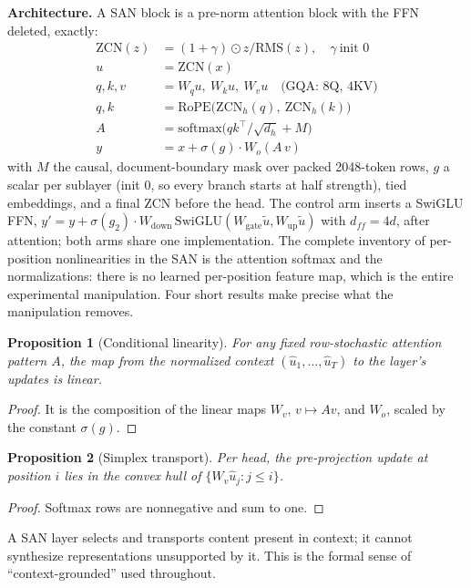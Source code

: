 \documentclass[letterpaper]{article} %
\newtheorem{proposition}{Proposition}
\begin{document}
\textbf{Architecture.} A SAN block is a pre-norm attention block with the
FFN deleted, exactly:
\begin{align*}
\mathrm{ZCN}(z) &= (1+\gamma)\odot z/\mathrm{RMS}(z), \quad \gamma\
\text{init } 0\\
u &= \mathrm{ZCN}(x)\\
q,k,v &= W_q u,\ W_k u,\ W_v u \quad \text{(GQA: 8Q, 4KV)}\\
q,k &= \mathrm{RoPE}\big(\mathrm{ZCN}_h(q),\ \mathrm{ZCN}_h(k)\big)\\
A &= \mathrm{softmax}\big(qk^{\top}/\sqrt{d_h} + M\big)\\
y &= x + \sigma(g)\cdot W_o(A\,v)
\end{align*}
with $M$ the causal, document-boundary mask over packed 2048-token rows,
$g$ a scalar per sublayer (init 0, so every branch starts at half
strength), tied embeddings, and a final ZCN before the head. The control
arm inserts a SwiGLU FFN, $y' = y + \sigma(g_2)\cdot
W_{\mathrm{down}}\,\mathrm{SwiGLU}(W_{\mathrm{gate}}\tilde u,
W_{\mathrm{up}}\tilde u)$ with $d_{ff}=4d$, after attention; both arms
share one implementation. The complete inventory of per-position nonlinearities in
the SAN is the attention softmax and the normalizations: there is no
learned per-position feature map, which is the entire experimental
manipulation. Four short results make precise what the manipulation
removes.

\begin{proposition}[Conditional linearity]
For any fixed row-stochastic attention pattern $A$, the map from the
normalized context $(\hat u_1,\dots,\hat u_T)$ to the layer's updates is
linear.
\end{proposition}
\begin{proof}
It is the composition of the linear maps $W_v$, $v \mapsto Av$, and
$W_o$, scaled by the constant $\sigma(g)$.
\end{proof}

\begin{proposition}[Simplex transport]
Per head, the pre-projection update at position $i$ lies in the convex
hull of $\{W_v \hat u_j : j \le i\}$.
\end{proposition}
\begin{proof}
Softmax rows are nonnegative and sum to one.
\end{proof}

\noindent A SAN layer selects and transports content present in context;
it cannot synthesize representations unsupported by it. This is the formal
sense of ``context-grounded'' used throughout.
\end{document}
